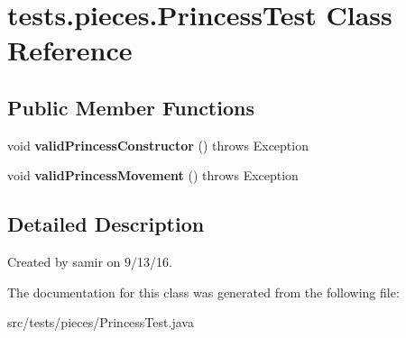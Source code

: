 \hypertarget{classtests_1_1pieces_1_1_princess_test}{}\section{tests.\+pieces.\+Princess\+Test Class Reference}
\label{classtests_1_1pieces_1_1_princess_test}
\subsection*{Public Member Functions}
\begin{DoxyCompactItemize}
\item 
\hypertarget{classtests_1_1pieces_1_1_princess_test_a43a248493cdd9ca69cb18290e3061167}{}\label{classtests_1_1pieces_1_1_princess_test_a43a248493cdd9ca69cb18290e3061167} 
void {\bfseries valid\+Princess\+Constructor} ()  throws Exception 
\item 
\hypertarget{classtests_1_1pieces_1_1_princess_test_af768e952940e3234a54be9b40a2ea0f5}{}\label{classtests_1_1pieces_1_1_princess_test_af768e952940e3234a54be9b40a2ea0f5} 
void {\bfseries valid\+Princess\+Movement} ()  throws Exception 
\end{DoxyCompactItemize}


\subsection{Detailed Description}
Created by samir on 9/13/16. 

The documentation for this class was generated from the following file\+:\begin{DoxyCompactItemize}
\item 
src/tests/pieces/Princess\+Test.\+java\end{DoxyCompactItemize}

